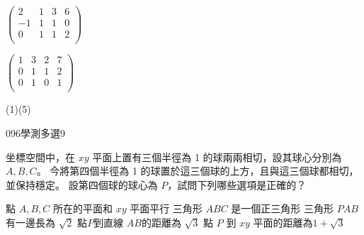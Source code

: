 \begin{QUESTIONS}
\begin{QUESTION}
\begin{QBODY}
\begin{QOPS}
				\QOP $\left( \begin{array}{cccc} 2 & 1 & 3 & 6 \\-1 & 1 & 1 & 0 \\0 & 1 & 1 & 2 \\\end{array}\right)$

				\QOP $\left( \begin{array}{cccc} 1 & 3 & 2 & 7 \\0 & 1 & 1 & 2 \\0 & 1 & 0 & 1 \\\end{array}\right)$
			\end{QOPS}
        \end{QBODY}
        \begin{QFROMS}
        \end{QFROMS}
        \begin{QTAGS}\end{QTAGS}
        \begin{QANS}
            (1)(5)
        \end{QANS}
        \begin{QSOLLIST}
        \end{QSOLLIST}
        \begin{QEMPTYSPACE}
        \end{QEMPTYSPACE}
    \end{QUESTION}
    \begin{QUESTION}
        \begin{ExamInfo}{096}{學測}{多選}{9}
        \end{ExamInfo}
        \begin{ExamAnsRateInfo}{42}{70}{39}{17}
        \end{ExamAnsRateInfo}
        \begin{QBODY}
			坐標空間中，在 $xy$ 平面上置有三個半徑為 1 的球兩兩相切，設其球心分別為 $A,B,C$。
			今將第四個半徑為 1 的球置於這三個球的上方，且與這三個球都相切，並保持穩定。
			設第四個球的球心為 $P$，試問下列哪些選項是正確的？
			\begin{QOPS}
			 \QOP 點 $A,B,C$ 所在的平面和 $xy$  平面平行
			 \QOP 三角形 $ABC$ 是一個正三角形 
			 \QOP 三角形 $PAB$ 有一邊長為 $\sqrt{2}$ 
			 \QOP 點$P$到直線 $AB$的距離為 $\sqrt{3}$ 
			 \QOP 點 $P$ 到 $xy$ 平面的距離為$1+ \sqrt{3}$
			\end{QOPS}
        \end{QBODY}
        \begin{QFROMS}
        \end{QFROMS}

\end{QUESTION}
\end{QUESTIONS}
